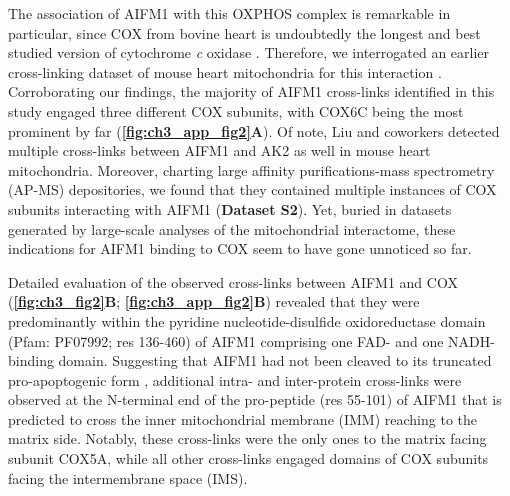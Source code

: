 The association of AIFM1 with this OXPHOS complex is remarkable in particular, since COX from bovine heart is undoubtedly the longest and best studied version of cytochrome \emph{c} oxidase \cite{RN29}. Therefore, we interrogated an earlier cross-linking dataset of mouse heart mitochondria for this interaction \cite{RN16}. Corroborating our findings, the majority of AIFM1 cross-links identified in this study engaged three different COX subunits, with COX6C being the most prominent by far (\textbf{\autoref{fig:ch3_app_fig2}A}). Of note, Liu and coworkers detected multiple cross-links between AIFM1 and AK2 as well in mouse heart mitochondria. Moreover, charting large affinity purifications-mass spectrometry (AP-MS) depositories, we found that they contained multiple instances of COX subunits interacting with AIFM1 \cite{RN30, RN32, RN31} (\textbf{Dataset S2}). Yet, buried in datasets generated by large-scale analyses of the mitochondrial interactome, these indications for AIFM1 binding to COX seem to have gone unnoticed so far.

Detailed evaluation of the observed cross-links between AIFM1 and COX (\textbf{\autoref{fig:ch3_fig2}B}; \textbf{\autoref{fig:ch3_app_fig2}B}) revealed that they were predominantly within the pyridine nucleotide-disulfide oxidoreductase domain (Pfam: PF07992; res 136-460) of AIFM1 comprising one FAD- and one NADH-binding domain. Suggesting that AIFM1 had not been cleaved to its truncated pro-apoptogenic form \cite{RN33}, additional intra- and inter-protein cross-links were observed at the N-terminal end of the pro-peptide (res 55-101) of AIFM1 that is predicted to cross the inner mitochondrial membrane (IMM) reaching to the matrix side. Notably, these cross-links were the only ones to the matrix facing subunit COX5A, while all other cross-links engaged domains of COX subunits facing the intermembrane space (IMS).

